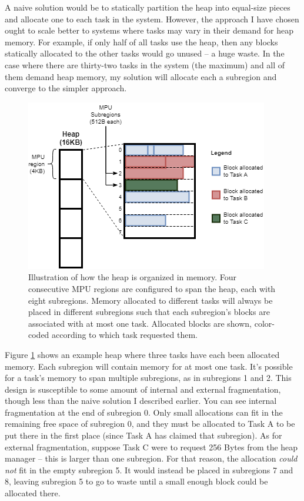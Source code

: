 A naive solution would be to statically partition the heap into equal-size pieces and allocate one to each task in the system. However, the approach I have chosen ought to scale better to systems where tasks may vary in their demand for heap memory. For example, if only half of all tasks use the heap, then any blocks statically allocated to the other tasks would go unused -- a huge waste. In the case where there are thirty-two tasks in the system (the maximum) and all of them demand heap memory, my solution will allocate each a subregion and converge to the simpler approach.

\begin{figure}[hbtp]
	\centering
	\includegraphics[width=0.7\linewidth]{figs/heap_prot.png}
	\caption{Illustration of how the heap is organized in memory. Four consecutive MPU regions are configured to span the heap, each with eight subregions. Memory allocated to different tasks will always be placed in different subregions such that each subregion's blocks are associated with at most one task. Allocated blocks are shown, color-coded according to which task requested them.}
	\label{fig:heap_prot}
\end{figure}

Figure \ref{fig:heap_prot} shows an example heap where three tasks have each been allocated memory. Each subregion will contain memory for at most one task. It's possible for a task's memory to span multiple subregions, as in subregions 1 and 2. This design is susceptible to some amount of internal and external fragmentation, though less than the naive solution I described earlier. You can see internal fragmentation at the end of subregion 0. Only small allocations can fit in the remaining free space of subregion 0, and they must be allocated to Task A to be put there in the first place (since Task A has claimed that subregion). As for external fragmentation, suppose Task C were to request 256 Bytes from the heap manager -- this is larger than one subregion. For that reason, the allocation \textit{could not} fit in the empty subregion 5. It would instead be placed in subregions 7 and 8, leaving subregion 5 to go to waste until a small enough block could be allocated there.

